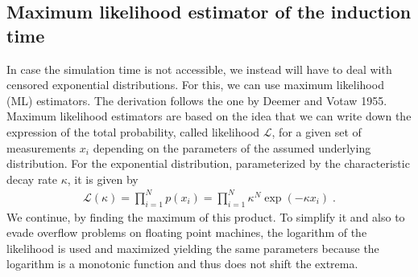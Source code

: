 \subsection{Maximum likelihood estimator of the induction time}
\label{sec:ml_estimator}
In case the simulation time is not accessible, we instead will have to deal with censored exponential distributions. For this, we can use maximum likelihood (ML) estimators. The derivation follows the one by Deemer and Votaw 1955\cite{Deemer1955}.\\

Maximum likelihood estimators are based on the idea that we can write down the expression of the total probability, called likelihood $\mathcal{L}$, for a given set of measurements $x_i$ depending on the parameters of the assumed underlying distribution. For the exponential distribution, parameterized by the characteristic decay rate $\kappa$, it is given by
\begin{align}
\label{eqn:exponential_product}
\mathcal{L}(\kappa) = \prod_{i=1}^N p(x_i) = \prod_{i=1}^N \kappa^N \exp\left( - \kappa x_i \right ) \; \text{.}
\end{align}
We continue, by finding the maximum of this product. To simplify it and also to evade overflow problems on floating point machines, the logarithm of the likelihood is used and maximized yielding the same parameters because the logarithm is a monotonic function and thus does not shift the extrema.\\

